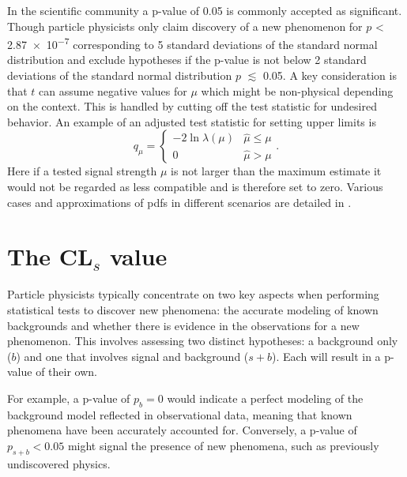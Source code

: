 In the scientific community a p-value of 0.05 is commonly accepted as significant. Though particle physicists only claim discovery of a new phenomenon for $p$ < \qty{2.87e-7}{} corresponding to 5 standard deviations of the standard normal distribution and exclude hypotheses if the p-value is not below 2 standard deviations of the standard normal distribution $p$ $\lesssim$ \qty{0.05}{}. A key consideration is that $t$ can assume negative values for $\mu$ which might be non-physical depending on the context. This is handled by cutting off the test statistic for undesired behavior. An example of an adjusted test statistic for setting upper limits is
\begin{equation}
    q_\mu=
    \begin{cases}
        -2\ln \lambda(\mu) & \hat{\mu}\leq\mu \\
        0                  & \hat{\mu}> \mu
    \end{cases}.
\end{equation}
Here if a tested signal strength $\mu$ is not larger than the maximum estimate it would not be regarded as less compatible and is therefore set to zero. Various cases and approximations of \acp{pdf} in different scenarios are detailed in \citep{cowan2011asymptotic}.

\section{The CL$_s$ value}\label{sec:cls}
Particle physicists typically concentrate on two key aspects when performing statistical tests to discover new phenomena: the accurate modeling of known backgrounds and whether there is evidence in the observations for a new phenomenon. This involves assessing two distinct hypotheses: a background only ($b$) and one that involves signal and background ($s+b$). Each will result in a p-value of their own.

For example, a p-value of $p_{b} = 0$ would indicate a perfect modeling of the background model reflected in observational data, meaning that known phenomena have been accurately accounted for. Conversely, a p-value of $p_{s+b} < 0.05$ might signal the presence of new phenomena, such as previously undiscovered physics.

